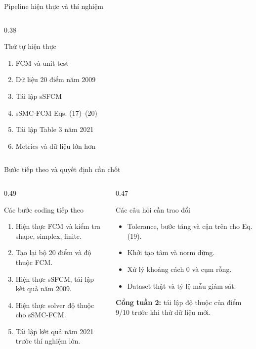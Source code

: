 \documentclass[t,aspectratio=169]{beamer}
\begin{document}
\begin{frame}{Pipeline hiện thực và thí nghiệm}
\begin{columns}[T,onlytextwidth]
\begin{column}{0.38\textwidth}
\begin{block}{Thứ tự hiện thực}
\begin{enumerate}
          \item FCM và unit test
          \item Dữ liệu 20 điểm năm 2009
          \item Tái lập sSFCM
          \item sSMC-FCM Eqs. (17)--(20)
          \item Tái lập Table 3 năm 2021
          \item Metrics và dữ liệu lớn hơn
        \end{enumerate}
      \end{block}
    \end{column}
  \end{columns}
\end{frame}

\begin{frame}{Bước tiếp theo và quyết định cần chốt}
  \small
  \begin{columns}[T,onlytextwidth]
    \begin{column}{0.49\textwidth}
      \begin{block}{Các bước coding tiếp theo}
        \begin{enumerate}
          \item Hiện thực FCM và kiểm tra shape, simplex, finite.
          \item Tạo lại bộ 20 điểm và độ thuộc FCM.
          \item Hiện thực sSFCM, tái lập kết quả năm 2009.
          \item Hiện thực solver độ thuộc cho sSMC-FCM.
          \item Tái lập kết quả năm 2021 trước thí nghiệm lớn.
        \end{enumerate}
      \end{block}
    \end{column}
    \begin{column}{0.47\textwidth}
      \begin{alertblock}{Các câu hỏi cần trao đổi}
        \begin{itemize}
          \item Tolerance, bước tăng và cận trên cho Eq. (19).
          \item Khởi tạo tâm và norm dừng.
          \item Xử lý khoảng cách 0 và cụm rỗng.
          \item Dataset thật và tỷ lệ mẫu giám sát.
        \end{itemize}
      \end{alertblock}
      \textbf{Cổng tuần 2:} tái lập độ thuộc của điểm 9/10 trước khi thử dữ liệu mới.
    \end{column}
  \end{columns}
\end{frame}
\end{document}
